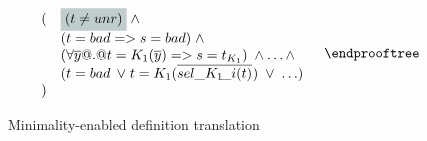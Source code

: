 \documentclass[preprint,nocopyrightspace,draft]{sigplanconf}
\begin{document}
\begin{figure}
\[\begin{array}{c}
{\begin{array}{l}
{\begin{array}{l}
     \begin{array}{ll}
          ( & \highlight{(t \neq \unr)}\;\land \\
            & (t = \bad => s = \bad)\;\land \\ 
            & (\forall \ol{y} @.@ t = K_1(\ol{y}) => s = t_{K_1})\;\land \ldots \land \\
            & (t = \bad\;\lor\;t = K_1(\oln{{\sel{K_1}{i}}(t)}{})\;\lor\;\ldots) \\ 
          )
                   \end{array}
     \end{array}}
  \end{array}}
\endprooftree
\end{array}\]
\caption{Minimality-enabled definition translation}\label{fig:min-def-trans}
\end{figure}

\end{document}
